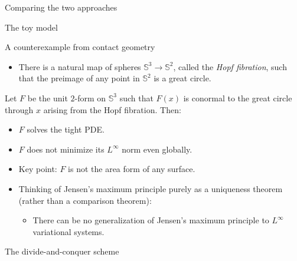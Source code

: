 \documentclass[10pt]{beamer}
\begin{document}
\begin{frame}{Comparing the two approaches}
    
\end{frame}

\begin{frame}{The toy model}

\end{frame}

\begin{frame}{A counterexample from contact geometry}
    \begin{itemize}
        \item There is a natural map of spheres $\mathbb S^3 \to \mathbb S^2$, called the \emph{Hopf fibration}, such that the preimage of any point in $\mathbb S^2$ is a great circle. 
    \end{itemize}

    \begin{theorem}[B '24]
    Let $F$ be the unit $2$-form on $\mathbb S^3$ such that $F(x)$ is conormal to the great circle through $x$ arising from the Hopf fibration.
    Then: 
\begin{itemize}
    \item $F$ solves the tight PDE.  
    \item $F$ does not minimize its $L^\infty$ norm even globally.
\end{itemize}
\end{theorem}

\begin{itemize}
\item Key point: $F$ is not the area form of any surface.  
\item Thinking of Jensen's maximum principle purely as a uniqueness theorem (rather than a comparison theorem):  
\begin{itemize}
\item There can be no generalization of Jensen's maximum principle to $L^\infty$ variational systems.
\end{itemize}
\end{itemize}
\end{frame}

\begin{frame}{The divide-and-conquer scheme}
    
\end{frame}
\end{document}
